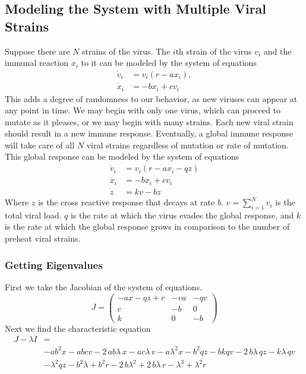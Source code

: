 \documentclass{article}
\begin{document}
\subsection{Modeling the System with Multiple Viral Strains}
Suppose there are $N$ strains of the virus.  The $i$th strain of the virus $v_i$ and the immunal reaction $x_i$ to it can be modeled by the system of equations
\begin{equation}
    \begin{split}
        \dot v_i &= v_i(r - ax_i), \\
        \dot x_i &= -bx_i + cv_i
    \end{split}
\end{equation}
This adds a degree of randomness to our behavior, as new viruses can appear at any point in time. We may begin with only one virus, which can proceed to mutate as it pleases, or we may begin with many strains. Each new viral strain should result in a new immune response. Eventually, a global immune response will take care of all $N$ viral strains regardless of mutation or rate of mutation. This global response can be modeled by the system of equations
\begin{equation}
    \begin{split}
        \dot v_i &= v_i(r - ax_i - qz) \\
        \dot x_i &= -bx_i + cv_i \\
        \dot z &= kv - bz
    \end{split}
\end{equation}
Where $z$ is the cross reactive response that decays at rate $b$.  $v = \sum^{N}_{i=1} v_i$ is the total viral load. $q$ is the rate at which the virus evades the global response, and $k$ is the rate at which the global response grows in comparison to the number of preheat viral strains.


\subsubsection{Getting Eigenvalues}
First we take the Jacobian of the system of equations.
\begin{equation}
    J=
    \begin{pmatrix}
        -ax-qz+r    &-va    &-qv    \\
        c           &-b     &0      \\
        k           &0       &-b
    \end{pmatrix}
\end{equation}
Next we find the characteristic equation
\begin{equation}
    \begin{split}
        J - \lambda I &= \\ 
        &-a{b}^{2}x-abcv-2\,ab\lambda\,x-ac\lambda\,v-a{\lambda}^{2}x-{b}^{2}qz -bkqv-2\,b\lambda\,qz-k\lambda\,qv \\
        &-{\lambda}^{2}qz-{b}^{2}\lambda+{b}^ {2}r-2\,b{\lambda}^{2}+2\,b\lambda\,r-{\lambda}^{3}+{\lambda}^{2}r
    \end{split}
\end{equation}
\end{document}
